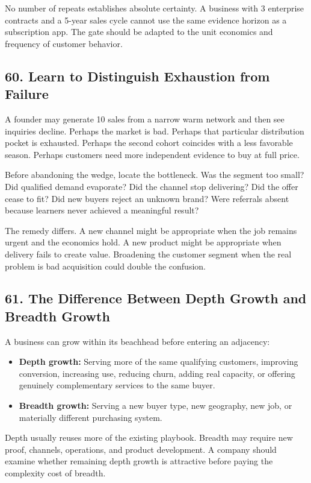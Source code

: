 No number of repeats establishes absolute certainty. A business with 3 enterprise contracts and a 5-year sales cycle cannot use the same evidence horizon as a subscription app. The gate should be adapted to the unit economics and frequency of customer behavior.

\subsection*{60. Learn to Distinguish Exhaustion from Failure}

A founder may generate 10 sales from a narrow warm network and then see inquiries decline. Perhaps the market is bad. Perhaps that particular distribution pocket is exhausted. Perhaps the second cohort coincides with a less favorable season. Perhaps customers need more independent evidence to buy at full price.

Before abandoning the wedge, locate the bottleneck. Was the segment too small? Did qualified demand evaporate? Did the channel stop delivering? Did the offer cease to fit? Did new buyers reject an unknown brand? Were referrals absent because learners never achieved a meaningful result?

The remedy differs. A new channel might be appropriate when the job remains urgent and the economics hold. A new product might be appropriate when delivery fails to create value. Broadening the customer segment when the real problem is bad acquisition could double the confusion.

\subsection*{61. The Difference Between Depth Growth and Breadth Growth}

A business can grow within its beachhead before entering an adjacency:

\begin{itemize}
    \item \textbf{Depth growth:} Serving more of the same qualifying customers, improving conversion, increasing use, reducing churn, adding real capacity, or offering genuinely complementary services to the same buyer.
    \item \textbf{Breadth growth:} Serving a new buyer type, new geography, new job, or materially different purchasing system.
\end{itemize}

Depth usually reuses more of the existing playbook. Breadth may require new proof, channels, operations, and product development. A company should examine whether remaining depth growth is attractive before paying the complexity cost of breadth.


